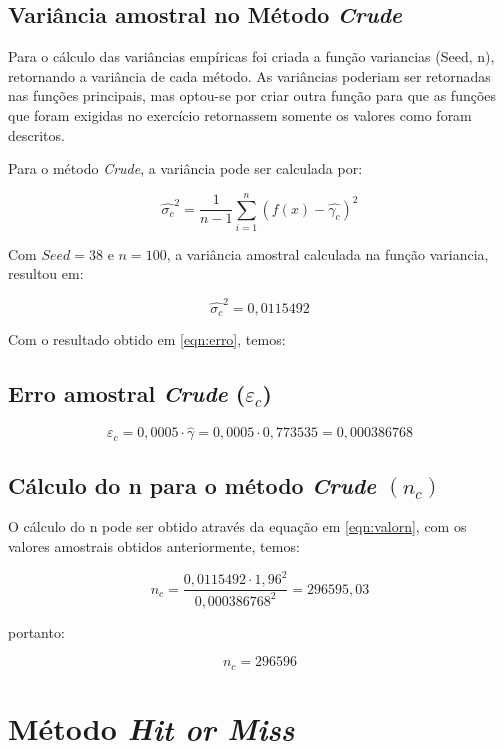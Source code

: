 \documentclass{article}
\begin{document}
\subsection{Variância amostral no Método \textit{Crude}}
Para o cálculo das variâncias empíricas foi criada a função variancias (Seed, n), retornando a variância de cada método. As variâncias poderiam ser retornadas nas funções principais, mas optou-se por criar outra função para que as funções que foram exigidas no exercício retornassem somente os valores como foram descritos.

Para o método \textit{Crude}, a variância pode ser calculada por:

\begin{equation*}
    \hat{\sigma_c}^2 = \frac{1}{n-1}\sum_{i=1}^n (f(x) - \hat{\gamma_c})^2
\end{equation*}

Com $Seed=38$ e $n=100$, a variância amostral calculada na função variancia, resultou em:

$$\hat{\sigma_c}^2 = 0,0115492$$

Com o resultado obtido em \ref{eqn:erro}, temos:

\subsection{Erro amostral \textit{Crude} ($\varepsilon_c$)}

\begin{equation*}
    \varepsilon_c = 0,0005\cdot\hat{\gamma} = 0,0005\cdot0,773535 = 0,000386768 
\end{equation*}

\subsection{Cálculo do n para o método \textit{Crude} $(n_c)$}

O cálculo do n pode ser obtido através da equação em \ref{eqn:valorn}, com os valores amostrais obtidos anteriormente, temos:

\begin{equation*}
    n_c = \frac{0,0115492\cdot1,96^2}{0,000386768^2} = 296595,03
\end{equation*}

portanto:

\[
    n_c = 296596
\]



\section{Método \textit{Hit or Miss}}
\end{document}
